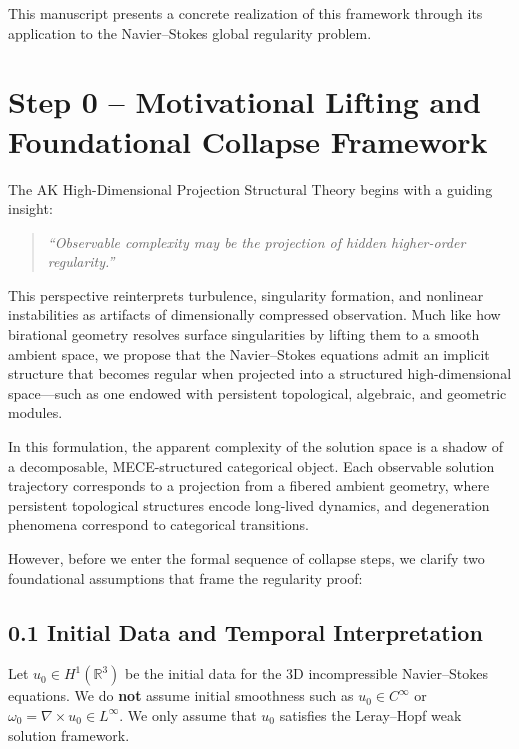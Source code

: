 \documentclass[11pt]{article}
\theoremstyle{definition}
\begin{document}
This manuscript presents a concrete realization of this framework through its application to the Navier--Stokes global regularity problem.



\section{Step 0 – Motivational Lifting and Foundational Collapse Framework}

The AK High-Dimensional Projection Structural Theory begins with a guiding insight:

\begin{quote}
\textit{“Observable complexity may be the projection of hidden higher-order regularity.”}
\end{quote}

This perspective reinterprets turbulence, singularity formation, and nonlinear instabilities as artifacts of dimensionally compressed observation. Much like how birational geometry resolves surface singularities by lifting them to a smooth ambient space, we propose that the Navier--Stokes equations admit an implicit structure that becomes regular when projected into a structured high-dimensional space—such as one endowed with persistent topological, algebraic, and geometric modules.

In this formulation, the apparent complexity of the solution space is a shadow of a decomposable, MECE-structured categorical object. Each observable solution trajectory corresponds to a projection from a fibered ambient geometry, where persistent topological structures encode long-lived dynamics, and degeneration phenomena correspond to categorical transitions.

\vspace{1em}
However, before we enter the formal sequence of collapse steps, we clarify two foundational assumptions that frame the regularity proof:

\subsection*{0.1 Initial Data and Temporal Interpretation}

Let \( u_0 \in H^1(\mathbb{R}^3) \) be the initial data for the 3D incompressible Navier--Stokes equations. We do \textbf{not} assume initial smoothness such as \( u_0 \in C^\infty \) or \( \omega_0 = \nabla \times u_0 \in L^\infty \). We only assume that \( u_0 \) satisfies the Leray--Hopf weak solution framework.
\end{document}

